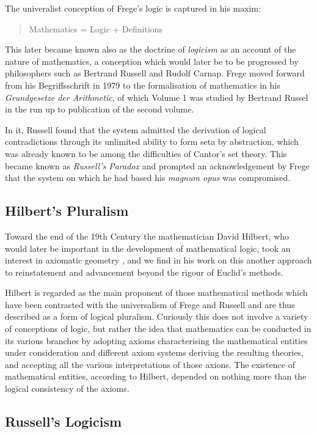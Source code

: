 The univeralist conception of Frege's logic is captured in his maxim:

\begin{quote}Mathematics = Logic + Definitions\end{quote}

  This later became known also as the doctrine of \emph{logicism} as an account of the nature of mathematics, a conception which would later be to be progressed by philosophers such as Bertrand Russell and Rudolf Carnap.
  Frege moved forward from his Begriffsschrift in 1979 to the formalisation of mathematics in his \emph{Grundgesetze der Arithmetic}\cite{frege1893}, of which Volume 1 was studied by Bertrand Russel in the run up to publication of the second volume.

  In it, Russell found that the system admitted the derivation of logical contradictions through its unlimited ability to form seta by abstraction, which was already known to be among the difficulties of Cantor's set theory.
  This became known as \emph{Russell's Paradox} and prompted an acknowledgement by Frege that the system on which he had based his \emph{magnum opus} was compromised.

  \subsection{Hilbert's Pluralism}

  Toward the end of the 19th Century the mathematician David Hilbert, who would later be important in the development of mathematical logic, took an interest in axiomatic geometry \cite{hilbert1899}, and we find in his work on this another approach to reinstatement and  advancement beyond the rigour of Euclid's methods.

  Hilbert is regarded as the main proponent of those mathematical methods which have been contrasted with the universalism of Frege and Russell and are thus described as a form of logical pluralism.
  Curiously this does not involve a variety of conceptions of logic, but rather the idea that mathematics can be conducted in its various branches by adopting axioms characterising the mathematical entities under consideration and different axiom systems deriving the resulting theories, and accepting all the various interpretations of those axions.
  The existence of mathematical entities, according to Hilbert, depended on nothing more than the logical consistency of the axioms.

  \subsection{Russell's Logicism}
  
